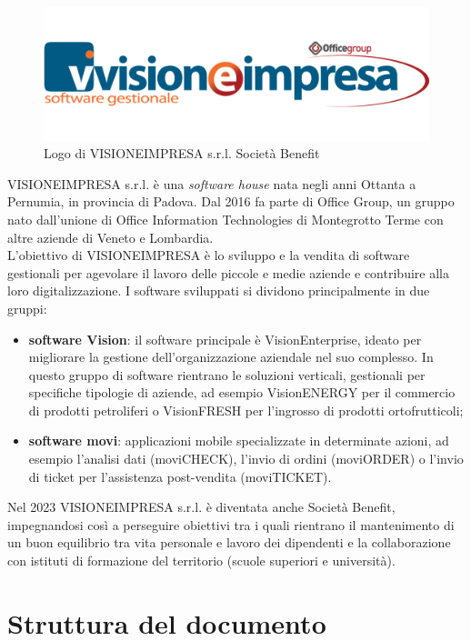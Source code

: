 \begin{figure}[!h]
    \centering 
    \includegraphics[width=0.6\columnwidth]{images/logo-visioneimpresa.png} 
    \caption{Logo di VISIONEIMPRESA s.r.l. Società Benefit}
\end{figure}
\noindent VISIONEIMPRESA s.r.l. è una \textit{software house} nata negli anni Ottanta a Pernumia, in provincia di Padova. Dal 2016 fa parte di Office Group, un gruppo nato dall'unione di Office Information Technologies di Montegrotto Terme con altre aziende di Veneto e Lombardia.\\
L'obiettivo di VISIONEIMPRESA è lo sviluppo e la vendita di software gestionali per agevolare il lavoro delle piccole e medie aziende e contribuire alla loro digitalizzazione. I software sviluppati si dividono principalmente in due gruppi:
\begin{itemize}
    \item \textbf{software Vision}: il software principale è VisionEnterprise, ideato per migliorare la gestione dell'organizzazione aziendale nel suo complesso. In questo gruppo di software rientrano le soluzioni verticali, gestionali per specifiche tipologie di aziende, ad esempio VisionENERGY per il commercio di prodotti petroliferi o VisionFRESH per l'ingrosso di prodotti ortofrutticoli;
    \item \textbf{software movi}: applicazioni mobile specializzate in determinate azioni, ad esempio l'analisi dati (moviCHECK), l'invio di ordini (moviORDER) o l'invio di ticket per l'assistenza post-vendita (moviTICKET).
\end{itemize}
\noindent Nel 2023 VISIONEIMPRESA s.r.l. è diventata anche \gls{Società Benefit}\glsfirstoccur, impegnandosi così a perseguire obiettivi tra i quali rientrano il mantenimento di un buon equilibrio tra vita personale e lavoro dei dipendenti e la collaborazione con istituti di formazione del territorio (scuole superiori e università).

\section{Struttura del documento}


